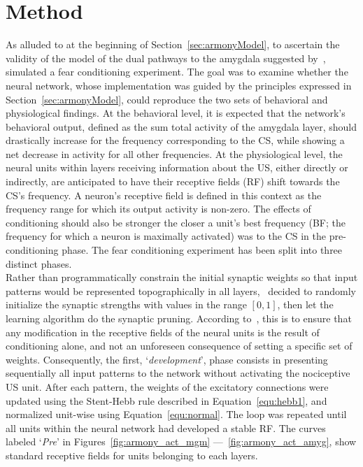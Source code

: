 \section{Method}
As alluded to at the beginning of Section~\ref{sec:armonyModel}, to ascertain the validity of the model of the dual pathways to the amygdala suggested by~\citet{Ledoux1992},~\citet{Armony1995} simulated a fear conditioning experiment. The goal was to examine whether the neural network, whose implementation was guided by the principles expressed in Section~\ref{sec:armonyModel}, could reproduce the two sets of behavioral and physiological findings. At the behavioral level, it is expected that the network's behavioral output, defined as the sum total activity of the amygdala layer, should drastically increase for the frequency corresponding to the CS, while showing a net decrease in activity for all other frequencies. At the physiological level, the neural units within layers receiving information about the US, either directly or indirectly, are anticipated to have their receptive fields (RF) shift towards the CS's frequency. A neuron's receptive field is defined in this context as the frequency range for which its output activity is non-zero. The effects of conditioning should also be stronger the closer a unit's best frequency (BF\@; the frequency for which a neuron is maximally activated) was to the CS in the pre-conditioning phase. The fear conditioning experiment has been split into three distinct phases.\\

Rather than programmatically constrain the initial synaptic weights so that input patterns would be represented topographically in all layers,~\citet{Armony1995} decided to randomly initialize the synaptic strengths with values in the range $[0, 1]$, then let the learning algorithm do the synaptic pruning. According to~\citet{Armony1995}, this is to ensure that any modification in the receptive fields of the neural units is the result of conditioning alone, and not an unforeseen consequence of setting a specific set of weights. Consequently, the first, `\emph{development}', phase consists in presenting sequentially all input patterns to the network without activating the nociceptive US unit. After each pattern, the weights of the excitatory connections were updated using the Stent-Hebb rule described in Equation~\ref{equ:hebb1}, and normalized unit-wise using Equation~\ref{equ:normal}. The loop was repeated until all units within the neural network had developed a stable RF\@. The curves labeled `\emph{Pre}' in Figures~\ref{fig:armony_act_mgm} ---~\ref{fig:armony_act_amyg}, show standard receptive fields for units belonging to each layers.\\


